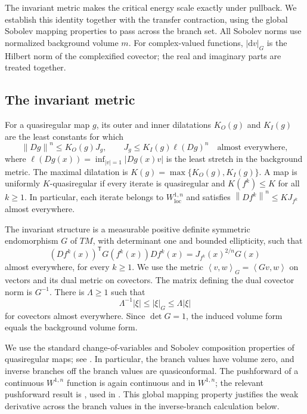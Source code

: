 \documentclass[10pt,a4paper]{amsart}
\newcommand{\norm}[1]{\left\lVert #1\right\rVert}
\newcommand{\ip}[2]{\left\langle #1,#2\right\rangle}
\newcommand{\dd}{\mathrm d}
\numberwithin{equation}{section}
\begin{document}
The invariant metric makes the critical energy scale exactly under pullback. We establish this identity together with the transfer contraction, using the global Sobolev mapping properties to pass across the branch set. All Sobolev norms use normalized background volume $m$. For complex-valued functions, $|\dd v|_G$ is the Hilbert norm of the complexified covector; the real and imaginary parts are treated together.

\subsection{The invariant metric}

For a quasiregular map $g$, its outer and inner dilatations $K_O(g)$ and $K_I(g)$ are the least constants for which
\[
 \norm{Dg}^n\le K_O(g)J_g,
 \qquad J_g\le K_I(g)\ell(Dg)^n
 \quad\text{almost everywhere},
\]
where $\ell(Dg(x))=\inf_{|v|=1}|Dg(x)v|$ is the least stretch in the background metric. The maximal dilatation is $K(g)=\max\{K_O(g),K_I(g)\}$. A map is uniformly $K$-quasiregular if every iterate is quasiregular and $K(f^k)\le K$ for all $k\ge1$. In particular, each iterate belongs to $W^{1,n}_{\mathrm{loc}}$ and satisfies $\norm{Df^k}^n\le KJ_{f^k}$ almost everywhere.

The invariant structure is a measurable positive definite symmetric endomorphism $G$ of $TM$, with determinant one and bounded ellipticity, such that
\begin{equation}\label{eq:beltrami}
 (Df^k(x))^{\mathsf T}G(f^k(x))Df^k(x)
 =J_{f^k}(x)^{2/n}G(x)
\end{equation}
almost everywhere, for every $k\ge1$. We use the metric $\ip{v}{w}_G=\ip{Gv}{w}$ on vectors and its dual metric on covectors. The matrix defining the dual covector norm is $G^{-1}$. There is $\Lambda\ge1$ such that
\begin{equation}\label{eq:ellipticity}
 \Lambda^{-1}|\xi|\le |\xi|_G\le\Lambda|\xi|
\end{equation}
for covectors almost everywhere. Since $\det G=1$, the induced volume form equals the background volume form.

We use the standard change-of-variables and Sobolev composition properties of quasiregular maps; see \cite{HKM93, Rickman93}. In particular, the branch values have volume zero, and inverse branches off the branch values are quasiconformal. The pushforward of a continuous $W^{1,n}$ function is again continuous and in $W^{1,n}$; the relevant pushforward result is \cite[Lemmas 14.30 and 14.31]{HKM93}, used in \cite[Section 2]{OP14}. This global mapping property justifies the weak derivative across the branch values in the inverse-branch calculation below.
\end{document}
